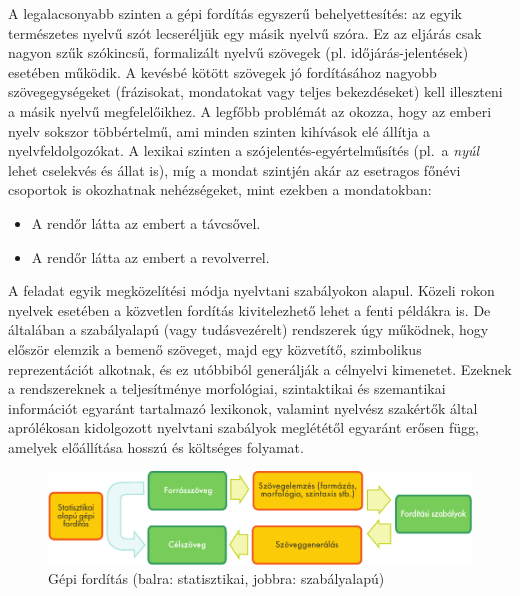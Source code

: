 \begin{multicols}{2}
A legalacsonyabb szinten a gépi fordítás egyszerű behelyettesítés: az egyik természetes nyelvű szót lecseréljük egy másik nyelvű szóra. Ez az eljárás csak nagyon szűk szókincsű, formalizált nyelvű szö\-ve\-gek (pl. időjárás-jelentések) esetében működik. A kevésbé kötött szövegek jó fordításához nagyobb szö\-veg\-egy\-sé\-ge\-ket (frá\-zi\-so\-kat, mon\-da\-to\-kat vagy teljes bekezdéseket) kell illeszteni a másik nyelvű megfelelőikhez. A legfőbb problémát az okozza, hogy az emberi nyelv sokszor többértelmű, ami minden szinten kihívások elé állítja a nyelvfeldolgozókat. A lexikai szinten a szójelentés-egyértelműsítés (pl.\ a \textit{nyúl} lehet cselekvés és állat is), míg a mondat szintjén akár az esetragos főnévi csoportok is okozhatnak nehézségeket, mint ezekben a mondatokban:

\begin{itemize}
\item A rendőr látta az embert a távcsővel. 
\item A rendőr látta az embert a revolverrel.
\end{itemize}

A feladat egyik megközelítési módja nyelvtani szabályokon alapul. Közeli rokon nyelvek esetében a közvetlen fordítás kivitelezhető lehet a fenti példákra is. De általában a szabályalapú (vagy tu\-dás\-ve\-zé\-relt) rendszerek úgy működnek, hogy először elemzik a bemenő szöveget, majd egy közvetítő, szimbolikus reprezentációt alkotnak, és ez utóbbiból generálják a célnyelvi kimenetet. Ezeknek a rend\-sze\-rek\-nek a teljesítménye morfológiai, szintaktikai és szemantikai információt egyaránt tartalmazó lexikonok, valamint nyelvész szakértők által aprólékosan kidolgozott nyelvtani szabályok meglététől egyaránt erősen függ, amelyek előállítása hosszú és költséges folyamat.

\begin{figure}[htb]
  \center
  \includegraphics[width=\textwidth]{../_media/hungarian/machine_translation}
  \caption{Gépi fordítás (balra: statisztikai, jobbra: szabályalapú)}
  \label{fig:mtarch_de}
\end{figure}


\end{multicols}
